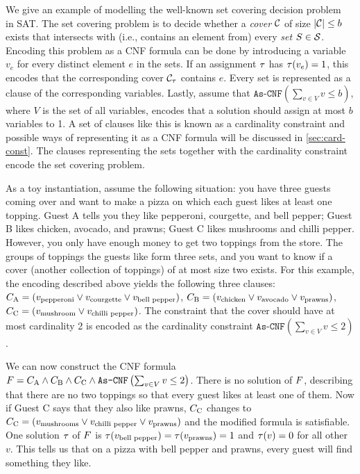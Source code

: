 \begin{example}\label{ex:sat-modelling}
  We give an example of modelling the well-known set covering decision problem~\autocite{DBLP:conf/coco/Karp72} in SAT.
  The set covering problem is to decide whether a \emph{cover} $\mathcal{C}$ of size $|\mathcal{C}|\le b$ exists that intersects with (i.e., contains an element from) every \emph{set} $S \in \mathcal{S}$.
  Encoding this problem as a CNF formula can be done by introducing a variable $v_e$ for every distinct element $e$ in the sets.
  If an assignment $\tau$ has $\tau(v_e)=1$, this encodes that the corresponding cover $\mathcal{C}_\tau$ contains $e$.
  Every set is represented as a clause of the corresponding variables.
  Lastly, assume that $\texttt{As-CNF}\left(\sum_{v \in V} v \le b\right)$, where $V$ is the set of all variables, encodes that a solution should assign at most $b$ variables to 1.
  A set of clauses like this is known as a cardinality constraint and possible ways of representing it as a CNF formula will be discussed in \cref{sec:card-const}.
  The clauses representing the sets together with the cardinality constraint encode the set covering problem.

  As a toy instantiation, assume the following situation:
  you have three guests coming over and want to make a pizza on which each guest likes at least one topping.
  Guest A tells you they like pepperoni, courgette, and bell pepper;
  Guest B likes chicken, avocado, and prawns;
  Guest C likes mushrooms and chilli pepper.
  However, you only have enough money to get two toppings from the store.
  The groups of toppings the guests like form three sets, and you want to know if a cover (another collection of toppings) of at most size two exists.
  For this example, the encoding described above yields the following three clauses:
  $C_\text{A} = (v_\text{pepperoni} \lor v_\text{courgette} \lor v_\text{bell pepper})$, $C_\text{B} = (v_\text{chicken} \lor v_\text{avocado} \lor v_\text{prawns})$, $C_\text{C} = (v_\text{mushroom} \lor v_\text{chilli pepper})$.
  The constraint that the cover should have at most cardinality 2 is encoded as the cardinality constraint $\texttt{As-CNF}\left(\sum_{v \in V} v \le 2\right)$.

  We can now construct the CNF formula $F = C_\text{A} \allowbreak \land C_\text{B} \allowbreak \land C_\text{C} \allowbreak \land \texttt{As-CNF}\left(\sum_{v \in V} v \le 2\right)$.
  There is no solution of $F$, describing that there are no two toppings so that every guest likes at least one of them.
  Now if Guest C says that they also like prawns, $C_\text{C}$ changes to $C_\text{C} = (v_\text{mushrooms} \lor v_\text{chilli pepper} \lor v_\text{prawns})$ and the modified formula is satisfiable.
  One solution $\tau$ of $F$ is $\tau(v_\text{bell pepper}) = \tau(v_\text{prawns}) = 1$ and $\tau(v) = 0$ for all other $v$.
  This tells us that on a pizza with bell pepper and prawns, every guest will find something they like.
\end{example}

